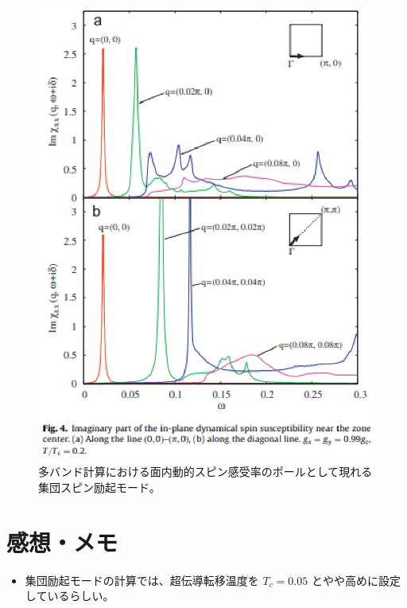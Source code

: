 \documentclass[a4paper,11pt]{jsarticle}
\begin{document}
\begin{figure}[htbp]
  \centering
  \includegraphics[width=\textwidth]{image-20.eps}
  \caption{多バンド計算における面内動的スピン感受率のポールとして現れる集団スピン励起モード。}
\end{figure}

\section*{感想・メモ}
\begin{itemize}
  \item 集団励起モードの計算では、超伝導転移温度を $T_c = 0.05$ とやや高めに設定しているらしい。
\end{itemize}
\end{document}
